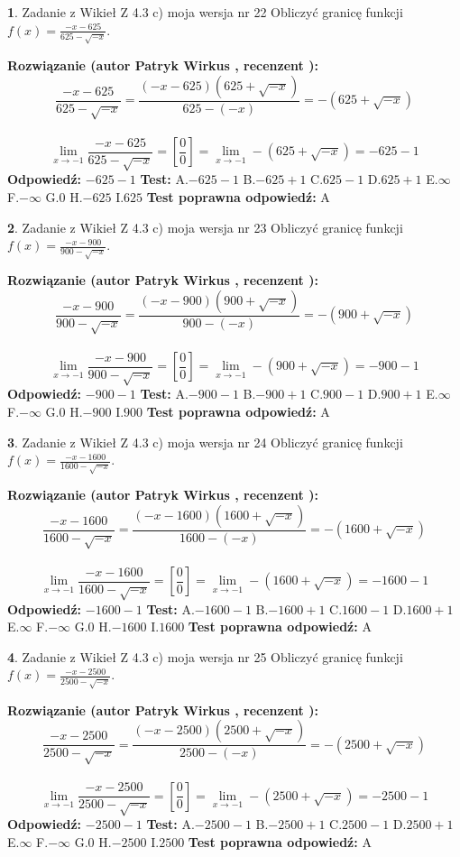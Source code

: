 \documentclass[12pt, a4paper]{article}
\theoremstyle{definition} %
\newtheorem{zad}{}
\newcommand{\zadStart}[1]{\begin{zad}#1\newline}
\newcommand{\zadStop}{\end{zad}}
\newcommand{\rozwStart}[2]{\noindent \textbf{Rozwiązanie (autor #1 , recenzent #2): }\newline}
\newcommand{\rozwStop}{\newline}
\newcommand{\odpStart}{\noindent \textbf{Odpowiedź:}\newline}
\newcommand{\odpStop}{\newline}
\newcommand{\testStart}{\noindent \textbf{Test:}\newline}
\newcommand{\testStop}{\newline}
\newcommand{\kluczStart}{\noindent \textbf{Test poprawna odpowiedź:}\newline}
\newcommand{\kluczStop}{\newline}
\begin{document}
\zadStart{Zadanie z Wikieł Z 4.3 c) moja wersja nr 22}
Obliczyć granicę funkcji $f(x)=\frac{-x-625}{625-\sqrt{-x}}$.
\zadStop
\rozwStart{Patryk Wirkus}{}
$$\frac{-x-625}{625-\sqrt{-x}}=\frac{(-x-625)(625+\sqrt{-x})}{625-(-x)}=-(625+\sqrt{-x})$$
\\
$$\lim\limits_{x\to-1}\frac{-x-625}{625-\sqrt{-x}}=[\frac{0}{0}]=\lim\limits_{x\to-1}-(625+\sqrt{-x}) =-625-1$$
\rozwStop
\odpStart
$-625-1$
\odpStop
\testStart
A.$-625-1$
B.$-625+1$
C.$625-1$
D.$625+1$
E.$\infty$
F.$-\infty$
G.$0$
H.$-625$
I.$625$
\testStop
\kluczStart
A
\kluczStop



\zadStart{Zadanie z Wikieł Z 4.3 c) moja wersja nr 23}
Obliczyć granicę funkcji $f(x)=\frac{-x-900}{900-\sqrt{-x}}$.
\zadStop
\rozwStart{Patryk Wirkus}{}
$$\frac{-x-900}{900-\sqrt{-x}}=\frac{(-x-900)(900+\sqrt{-x})}{900-(-x)}=-(900+\sqrt{-x})$$
\\
$$\lim\limits_{x\to-1}\frac{-x-900}{900-\sqrt{-x}}=[\frac{0}{0}]=\lim\limits_{x\to-1}-(900+\sqrt{-x}) =-900-1$$
\rozwStop
\odpStart
$-900-1$
\odpStop
\testStart
A.$-900-1$
B.$-900+1$
C.$900-1$
D.$900+1$
E.$\infty$
F.$-\infty$
G.$0$
H.$-900$
I.$900$
\testStop
\kluczStart
A
\kluczStop



\zadStart{Zadanie z Wikieł Z 4.3 c) moja wersja nr 24}
Obliczyć granicę funkcji $f(x)=\frac{-x-1600}{1600-\sqrt{-x}}$.
\zadStop
\rozwStart{Patryk Wirkus}{}
$$\frac{-x-1600}{1600-\sqrt{-x}}=\frac{(-x-1600)(1600+\sqrt{-x})}{1600-(-x)}=-(1600+\sqrt{-x})$$
\\
$$\lim\limits_{x\to-1}\frac{-x-1600}{1600-\sqrt{-x}}=[\frac{0}{0}]=\lim\limits_{x\to-1}-(1600+\sqrt{-x}) =-1600-1$$
\rozwStop
\odpStart
$-1600-1$
\odpStop
\testStart
A.$-1600-1$
B.$-1600+1$
C.$1600-1$
D.$1600+1$
E.$\infty$
F.$-\infty$
G.$0$
H.$-1600$
I.$1600$
\testStop
\kluczStart
A
\kluczStop



\zadStart{Zadanie z Wikieł Z 4.3 c) moja wersja nr 25}
Obliczyć granicę funkcji $f(x)=\frac{-x-2500}{2500-\sqrt{-x}}$.
\zadStop
\rozwStart{Patryk Wirkus}{}
$$\frac{-x-2500}{2500-\sqrt{-x}}=\frac{(-x-2500)(2500+\sqrt{-x})}{2500-(-x)}=-(2500+\sqrt{-x})$$
\\
$$\lim\limits_{x\to-1}\frac{-x-2500}{2500-\sqrt{-x}}=[\frac{0}{0}]=\lim\limits_{x\to-1}-(2500+\sqrt{-x}) =-2500-1$$
\rozwStop
\odpStart
$-2500-1$
\odpStop
\testStart
A.$-2500-1$
B.$-2500+1$
C.$2500-1$
D.$2500+1$
E.$\infty$
F.$-\infty$
G.$0$
H.$-2500$
I.$2500$
\testStop
\kluczStart
A
\kluczStop
\end{document}
